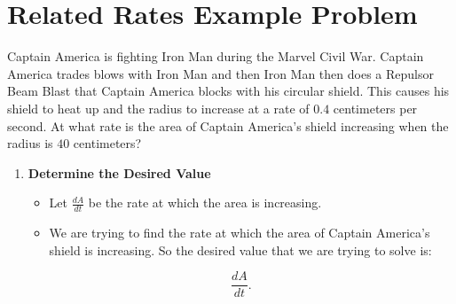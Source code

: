 \documentclass[12pt]{article}
\begin{document}
\section{Related Rates Example Problem}
Captain America is fighting Iron Man during the Marvel Civil War. Captain America trades blows with Iron Man and then Iron Man then does a Repulsor Beam Blast that Captain America blocks with his circular shield. This causes his shield to heat up and  the radius to increase at a rate of $0.4$ centimeters per second. At what rate is the area of Captain America's shield increasing when the radius is $40$ centimeters?
\begin{enumerate}
  \item \textbf{Determine the Desired Value}
  \begin {itemize}
    \item Let $\frac{dA}{dt}$ be the rate at which the area is increasing.
    \item We are trying to find the rate at which the area of Captain America's shield is increasing. So the desired value that we are trying to solve is:
    \end{itemize}
    \begin{equation}
      \frac{dA}{dt}. \tag{Desired Rate} \label{Desired Rate}
    \end{equation}


\end{enumerate}
\end{document}
